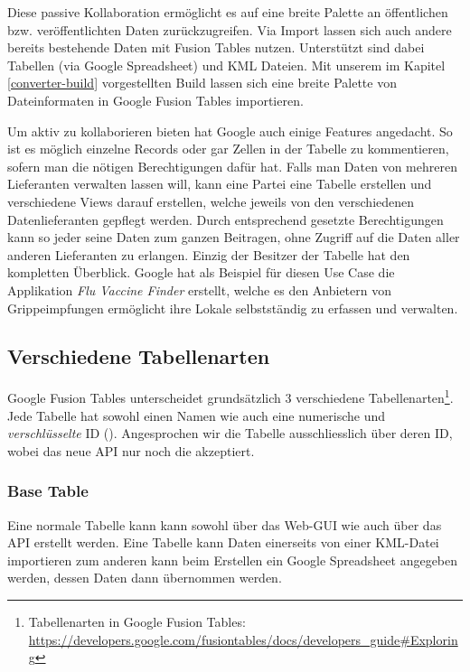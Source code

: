 Diese passive Kollaboration ermöglicht es auf eine breite Palette an öffentlichen bzw. veröffentlichten Daten zurückzugreifen. Via Import lassen sich auch andere bereits bestehende Daten mit Fusion Tables nutzen. Unterstützt sind dabei Tabellen (via Google Spreadsheet) und KML Dateien. Mit unserem im Kapitel \ref{converter-build} vorgestellten Build lassen sich eine breite Palette von Dateinformaten in Google Fusion Tables importieren.

Um aktiv zu kollaborieren bieten hat Google auch einige Features angedacht. So ist es möglich einzelne Records oder gar Zellen in der Tabelle zu kommentieren, sofern man die nötigen Berechtigungen dafür hat. Falls man Daten von mehreren Lieferanten verwalten lassen will, kann eine Partei eine Tabelle erstellen und verschiedene Views darauf erstellen, welche jeweils von den verschiedenen Datenlieferanten gepflegt werden. Durch entsprechend gesetzte Berechtigungen kann so jeder seine Daten zum ganzen Beitragen, ohne Zugriff auf die Daten aller anderen Lieferanten zu erlangen. Einzig der Besitzer der Tabelle hat den kompletten Überblick. Google hat als Beispiel für diesen Use Case die Applikation \emph{Flu Vaccine Finder} erstellt, welche es den Anbietern von Grippeimpfungen ermöglicht ihre Lokale selbstständig zu erfassen und verwalten.\cite{data-gathering}

\subsection{Verschiedene Tabellenarten}
Google Fusion Tables unterscheidet grundsätzlich 3 verschiedene Tabellenarten\footnote{Tabellenarten in Google Fusion Tables: \url{https://developers.google.com/fusiontables/docs/developers_guide\#Exploring}}. Jede Tabelle hat sowohl einen Namen wie auch eine numerische und \emph{verschlüsselte} ID (). Angesprochen wir die Tabelle ausschliesslich über deren ID, wobei das neue API nur noch die  akzeptiert.

\subsubsection{Base Table}
Eine normale Tabelle kann kann sowohl über das Web-GUI wie auch über das API erstellt werden. Eine Tabelle kann Daten einerseits von einer \gls{KML}-Datei importieren zum anderen kann beim Erstellen ein Google Spreadsheet angegeben werden, dessen Daten dann übernommen werden.

